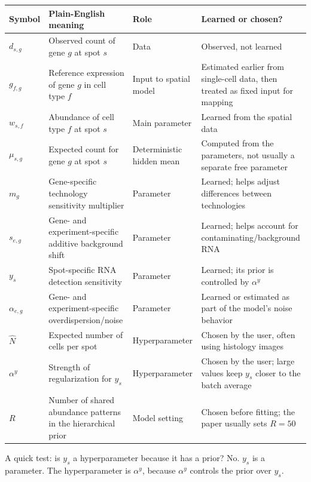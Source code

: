 \documentclass[11pt]{article}
\begin{document}
\begin{longtable}{>{\raggedright\arraybackslash}p{}>{\raggedright\arraybackslash}p{}>{\raggedright\arraybackslash}p{}>{\raggedright\arraybackslash}p{}}
\toprule
Symbol & Plain-English meaning & Role & Learned or chosen? \\
\midrule
\(d_{s,g}\) & Observed count of gene \(g\) at spot \(s\) & Data & Observed, not learned \\
\(g_{f,g}\) & Reference expression of gene \(g\) in cell type \(f\) & Input to spatial model & Estimated earlier from single-cell data, then treated as fixed input for mapping \\
\(w_{s,f}\) & Abundance of cell type \(f\) at spot \(s\) & Main parameter & Learned from the spatial data \\
\(\mu_{s,g}\) & Expected count for gene \(g\) at spot \(s\) & Deterministic hidden mean & Computed from the parameters, not usually a separate free parameter \\
\(m_g\) & Gene-specific technology sensitivity multiplier & Parameter & Learned; helps adjust differences between technologies \\
\(s_{e,g}\) & Gene- and experiment-specific additive background shift & Parameter & Learned; helps account for contaminating/background RNA \\
\(y_s\) & Spot-specific RNA detection sensitivity & Parameter & Learned; its prior is controlled by \(\alpha^y\) \\
\(\alpha_{e,g}\) & Gene- and experiment-specific overdispersion/noise & Parameter & Learned or estimated as part of the model's noise behavior \\
\(\hat N\) & Expected number of cells per spot & Hyperparameter & Chosen by the user, often using histology images \\
\(\alpha^y\) & Strength of regularization for \(y_s\) & Hyperparameter & Chosen by the user; large values keep \(y_s\) closer to the batch average \\
\(R\) & Number of shared abundance patterns in the hierarchical prior & Model setting & Chosen before fitting; the paper usually sets \(R=50\) \\
\bottomrule
\end{longtable}

\begin{checkpoint}
A quick test: is \(y_s\) a hyperparameter because it has a prior? No. \(y_s\) is a parameter. The hyperparameter is \(\alpha^y\), because \(\alpha^y\) controls the prior over \(y_s\).
\end{checkpoint}
\end{document}
